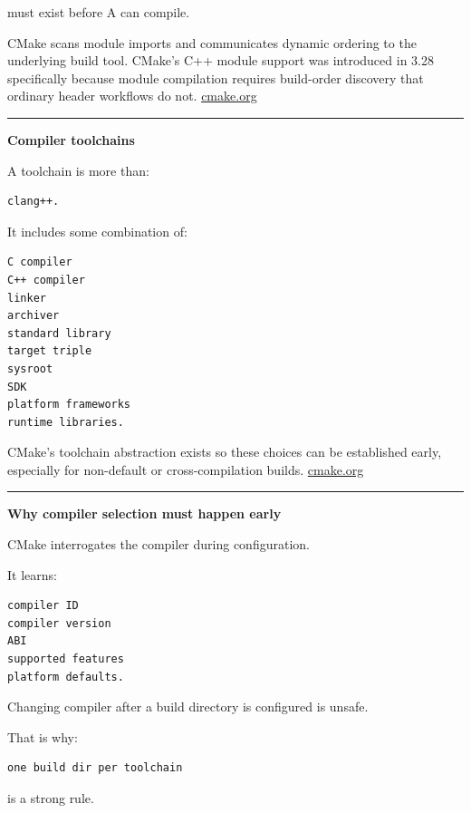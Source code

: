 must exist before A can compile.

CMake scans module imports and communicates dynamic ordering to the underlying build tool. CMake's C++ module support was introduced in 3.28 specifically because module compilation requires build-order discovery that ordinary header workflows do not. \href{https://cmake.org/cmake/help/git-stage/manual/cmake-cxxmodules.7.html?utm_source=chatgpt.com}{cmake.org}

\begin{center}\rule{0.5\linewidth}{0.5pt}\end{center}

\textbf{Compiler toolchains}

A toolchain is more than:

\begin{verbatim}
clang++.
\end{verbatim}

It includes some combination of:

\begin{verbatim}
C compiler
C++ compiler
linker
archiver
standard library
target triple
sysroot
SDK
platform frameworks
runtime libraries.
\end{verbatim}

CMake's toolchain abstraction exists so these choices can be established early, especially for non-default or cross-compilation builds. \href{https://cmake.org/cmake/help/latest/manual/cmake-toolchains.7.html?highlight=toolchains&utm_source=chatgpt.com}{cmake.org}

\begin{center}\rule{0.5\linewidth}{0.5pt}\end{center}

\textbf{Why compiler selection must happen early}

CMake interrogates the compiler during configuration.

It learns:

\begin{verbatim}
compiler ID
compiler version
ABI
supported features
platform defaults.
\end{verbatim}

Changing compiler after a build directory is configured is unsafe.

That is why:

\begin{verbatim}
one build dir per toolchain
\end{verbatim}

is a strong rule.

